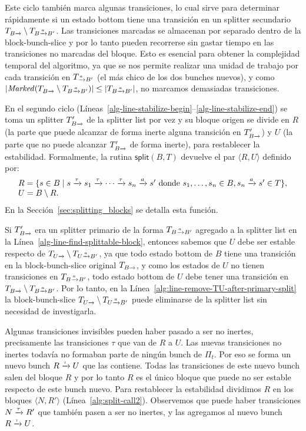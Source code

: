 Este ciclo también marca algunas transiciones, lo cual sirve para determinar rápidamente si un estado bottom tiene una transición en un splitter secundario $\TB \setminus \TBaB$. Las transiciones marcadas se almacenan por separado dentro de la block-bunch-slice
y por lo tanto pueden recorrerse sin gastar tiempo en las transiciones no marcadas del bloque.
Esto es esencial para obtener la complejidad temporal del algoritmo,
ya que se nos permite realizar una unidad de trabajo por cada transición en $\TaB$
(el más chico de los dos bunches nuevos),
y como $\size{\Marked(\TB \setminus \TBaB)} \leq \size{\TBaB}$, no marcamos demasiadas transiciones.


En el segundo ciclo (Líneas~\ref{alg-line-stabilize-begin}--\ref{alg-line-stabilize-end}) se toma un splitter $\TB'$ de la splitter list
por vez
y su bloque origen se divide en $R$ (la parte que puede alcanzar de forma inerte alguna transición en $\TB'$) y $U$ (la parte que no puede alcanzar $\TB'$ de forma inerte),
para restablecer la estabilidad.
Formalmente, la rutina $\mathsf{split}(B,T)$ devuelve el par $\langle R,U\rangle$ definido por:
\begin{equation}\begin{array}{l}
\label{eqn:splitproperty}
R =\{ s\in B\mid s\pijl{\tau}s_1\pijl{\tau}\cdots\pijl{\tau}s_n\pijl{a}s'\textrm{ donde } s_1,\ldots, s_{n} \in B, s_n\pijl{a}s'\in T\},\\
U = B\setminus R.
\end{array}\end{equation}
En la Sección~\ref{sec:splitting_blocks} se detalla esta función.

Si $\TB'$ era un splitter primario de la forma $\TBaB$ agregado a la splitter list en la Línea~\ref{alg-line-find-splittable-block},
entonces sabemos que $U$ debe ser estable respecto de $T_{U\pijl{}} \setminus T_{U\pijl{a} B'}$, ya que
todo estado bottom de $B$ tiene una transición en la block-bunch-slice original $\TB$,
y como los estados de $U$ no tienen transiciones en $\TBaB$,
todo estado bottom de $U$ debe tener una transición en $\TB \setminus \TBaB$.
Por lo tanto, en la Línea~\ref{alg:line-remove-TU-after-primary-split} la block-bunch-slice $T_{U\pijl{}} \setminus T_{U\pijl{a} B'}$ puede eliminarse de la splitter list
sin necesidad de investigarla.

Algunas transiciones invisibles pueden haber pasado a ser no inertes, precisamente las transiciones $\tau$ que van de $R$ a $U$.
Las nuevas transiciones no inertes todavía no formaban parte de ningún bunch de $\Pi_t$.
Por eso se forma un nuevo bunch $R\pijl{\tau}U$ que las contiene. Todas las transiciones de este nuevo bunch salen del bloque
$R$ y por lo tanto $R$ es el único bloque que puede no ser estable respecto de este bunch nuevo. Para restablecer la estabilidad
dividimos $R$ en los bloques $\langle N, R'\rangle$ (Línea~\ref{alg:split-call2}). Observemos que puede haber transiciones $N\pijl{\tau}R'$ que también pasen a ser
no inertes, y las agregamos al nuevo bunch $R\pijl{\tau}U$.

